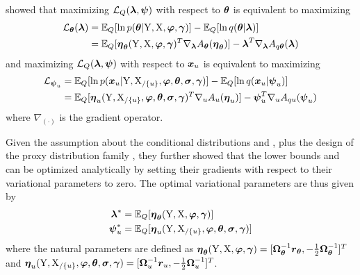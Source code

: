 \cite{gorbach2017scalable} showed that maximizing $\mathcal{L}_Q(\boldsymbol{\lambda},\boldsymbol{\psi})$ with respect to $\boldsymbol{\theta}$ is equivalent to maximizing
\begin{align}
    \mathcal{L}_{\dymtheta}(\dymlambdavi) 
    & = \mathbb{E}_Q[
            \ln{p(\dymtheta\vert\dymY,\dymX,\dymphi,\dymgamma)}]
        - \mathbb{E}_Q[
            \ln{q(\dymtheta\vert\dymlambdavi)}]
    \nonumber             
    \\
    & = \mathbb{E}_Q[
        \dymetathetacanonical^T\nabla_{\dymlambdavi}\dymAthetacanonical] - \dymlambdavi^T\nabla_{\dymlambdavi}\dymAthetacanonicalQ
    \label{eq-vgmgp-elbo-theta}
\end{align}
and maximizing $\mathcal{L}_Q(\boldsymbol{\lambda},\boldsymbol{\psi})$ with respect to $\boldsymbol{x}_{u}$ is equivalent to maximizing
\begin{align}
    \mathcal{L}_{\dympsiuvi} 
    & = \mathbb{E}_Q[
            \ln{p(\dymxk{u}\vert\dymY,\dymXwithoutk{u},\dymphi,\dymtheta,\dymsigma,\dymgamma)}]
        - \mathbb{E}_Q[
            \ln{q(\dymxk{u}\vert\dympsiuvi)}
        ]
    \nonumber
    \\
    & = \mathbb{E}_Q[
        \dymetaucanonical^T\nabla_{u}\dymAucanonical] -\dympsiuvi^T\nabla_{u}\dymAucanonicalQ
    \label{eq-vgmgp-elbo-xu}
\end{align}
where $\nabla_{(\cdot)}$ is the gradient operator.

Given the assumption about the conditional distributions  and , plus the design of the proxy distribution family , they further showed that the lower bounds  and  can be optimized analytically by setting their gradients  with respect to their variational parameters to zero. 
The optimal variational parameters are thus given by
\begin{align}
    \dymlambdavi^*
    & = \mathbb{E}_Q[\dymetathetacanonical] 
    \label{eq-vgmgp-lambda-vi-optimal}
    \\
    \dympsiuvi^* 
    & = \mathbb{E}_Q[\dymetaucanonical]
    \label{eq-vgmgp-psiu-vi-optimal}
\end{align}
where the natural parameters are defined as $\boldsymbol{\eta}_{\boldsymbol{\theta}}(\mathrm{Y},\mathrm{X},\boldsymbol{\varphi},\boldsymbol{\gamma}) = [\boldsymbol{\Omega}_{\boldsymbol{\theta}}^{-1}\boldsymbol{r}_{\boldsymbol{\theta}}, -\frac{1}{2}\boldsymbol{\Omega}_{\boldsymbol{\theta}}^{-1}]^T$ and $\boldsymbol{\eta}_{u}(\mathrm{Y},\mathrm{X}_{/\{u\}},\boldsymbol{\varphi},\boldsymbol{\theta},\boldsymbol{\sigma},\boldsymbol{\gamma}) = [\boldsymbol{\Omega}_{u}^{-1} \boldsymbol{r}_{u}, -\frac{1}{2}\boldsymbol{\Omega}_{u}^{-1}]^T$.

